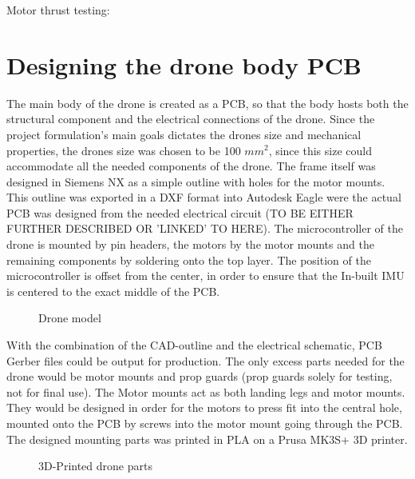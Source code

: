 \documentclass[12pt]{article}
\begin{document}
Motor thrust testing:

\section{Designing the drone body PCB}

The main body of the drone is created as a PCB, so that the body hosts both the structural component and the electrical 
connections of the drone. Since the project formulation's main goals dictates the drones size and mechanical properties, 
the drones size was chosen to be 100 $mm^2$, since this size could accommodate all the needed components of the drone. 
The frame itself was designed in Siemens NX as a simple outline with holes for the motor mounts. 
This outline was exported in a DXF format into Autodesk Eagle were the actual PCB was designed from the needed electrical circuit 
(TO BE EITHER FURTHER DESCRIBED OR 'LINKED' TO HERE). The microcontroller of the drone is mounted by pin headers, 
the motors by the motor mounts and the remaining components by soldering onto the top layer. 
The position of the microcontroller is offset from the center, in order to ensure that the In-built IMU is centered to the exact middle of the PCB.

\begin{figure}[H]%
    \centering
    \qquad
    \caption{Drone model}%
    \label{fig:example}%
\end{figure}

With the combination of the CAD-outline and the electrical schematic, PCB Gerber files could be output for production. The only excess parts needed for the drone would be motor mounts and prop guards (prop guards solely for testing, not for final use).
 The Motor mounts act as both landing legs and motor mounts. They would be designed in order for the motors to press fit into the central hole, 
mounted onto the PCB by screws into the motor mount going through the PCB. The designed mounting parts was printed in PLA on a Prusa MK3S+ 3D printer. 

\begin{figure}[H]%
    \centering
    \qquad
    \qquad
    \caption{3D-Printed drone parts}%
    \label{fig:example}%
\end{figure}
\end{document}
